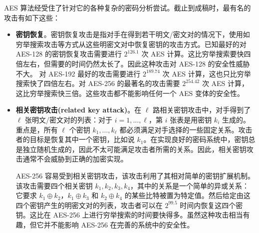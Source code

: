\begin{snote}[AES的安全性。]
AES 算法经受住了针对它的各种复杂的密码分析尝试。截止到成稿时，最有名的攻击有如下这些：
\begin{itemize}
	\item \textbf{密钥恢复}。密钥恢复攻击是指对手在得到若干明文/密文对的情况下，使用如穷举搜索攻击等方式从这些明密文对中恢复密钥的攻击方式。已知最好的对 AES-128 的密钥恢复攻击需要进行 $2^{126.1}$ 次 AES 计算。这比穷举搜索要快四倍左右，但需要的时间仍然太长了。因此这种攻击对 AES-128 的安全性威胁不大。
	对 AES-192 最好的攻击需要进行 $2^{189.74}$ 次 AES 计算，这也只比穷举搜索快了四倍左右。对 AES-256 的最著名的攻击需要 $2^{254.42}$ 次 AES 计算，这比穷举搜索快三倍。这些攻击都不能影响任何一个 AES 变体的安全性。
	\item \textbf{相关密钥攻击(related key attack)}。在 $\ell$ 路相关密钥攻击中，对手得到了 $\ell$ 张明文/密文对的列表：对于 $i=1,\dots,\ell$，第 $i$ 张表是用密钥 $k_i$ 生成的。重点是，所有 $\ell$ 个密钥 $k_1,\dots,k_\ell$ 都必须满足对手选择的一些固定关系。攻击者的目标是恢复其中一个密钥，比如说 $k_1$。在实现良好的密码系统中，密钥总是独立随机生成的，因此不太可能满足攻击者所需的关系。因此，相关密钥攻击通常不会威胁到正确的加密实现。

    AES-256 容易受到相关密钥攻击，该攻击利用了其相对简单的密钥扩展机制。该攻击需要四个相关密钥 $k_1,k_2,k_3,k_4$，其中的关系是一个简单的异或关系：它要求 $k_1\oplus k_2$，$k_1\oplus k_3$ 和 $k_2\oplus k_4$ 的某些比特被置为特定值。然后给定由这四个密钥产生的明密文对的列表，攻击者可以在 $2^{99.5}$ 时间内恢复这四个密钥。这比在 AES-256 上进行穷举搜索的时间要快得多。虽然这种攻击相当有趣，但它并不能影响 AES-256 在完善的系统中的安全性。
\end{itemize}
\end{snote}

